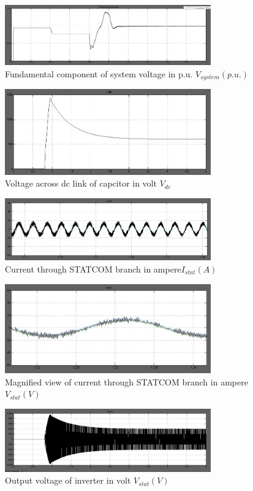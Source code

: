 \documentclass[journal,twoside]{IEEEtran}
\begin{document}
\begin{figure}[!ht]
\includegraphics[width=3.5in]{g}
\caption{Fundamental component of system voltage in p.u. $V_{system}(p.u.)$}
\label{fg }
\end{figure}


\begin{figure}[!ht]
\includegraphics[width=3.5in]{h}
\caption{Voltage across dc link of capcitor in volt $V_{dc}$}
\label{fh }
\end{figure}


\begin{figure}[!ht]
\includegraphics[width=3.5in]{i}
\caption{ Current through STATCOM branch in ampere$I_{stat}(A)$}
\label{fi }
\end{figure}


\begin{figure}[!ht]
\includegraphics[width=3.5in]{j}
\caption{Magnified view of current through STATCOM branch in ampere $V_{stat}(V)$}
\label{fj }
\end{figure}


\begin{figure}[!ht]
\includegraphics[width=3.5in]{k}
\caption{Output voltage of inverter in volt $V_{stat}(V)$ }
\label{fk }
\end{figure}
\end{document}
